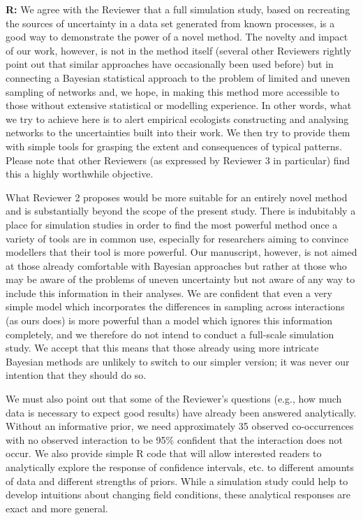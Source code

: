 \documentclass[12pt]{letter}
\begin{document}
		\textbf{R:} We agree with the Reviewer that a full simulation study, based on recreating the sources of uncertainty in a data set generated from known processes, is a good way to demonstrate the power of a novel method. The novelty and impact of our work, however, is not in the method itself (several other Reviewers rightly point out that similar approaches have occasionally been used before) but in connecting a Bayesian statistical approach to the problem of limited and uneven sampling of networks and, we hope, in making this method more accessible to those without extensive statistical or modelling experience. In other words, what we try to achieve here is to alert empirical ecologists constructing and analysing networks to the uncertainties built into their work. We then try to provide them with simple tools for grasping the extent and consequences of typical patterns. Please note that other Reviewers (as expressed by Reviewer 3 in particular) find this a highly worthwhile objective. 


		What Reviewer 2 proposes would be more suitable for an entirely novel method and is substantially beyond the scope of the present study. There is indubitably a place for simulation studies in order to find the most powerful method once a variety of tools are in common use, especially for researchers aiming to convince modellers that their tool is more powerful. Our manuscript, however, is not aimed at those already comfortable with Bayesian approaches but rather at those who may be aware of the problems of uneven uncertainty but not aware of any way to include this information in their analyses. We are confident that even a very simple model which incorporates the differences in sampling across interactions (as ours does) is more powerful than a model which ignores this information completely, and we therefore do not intend to conduct a full-scale simulation study. We accept that this means that those already using more intricate Bayesian methods are unlikely to switch to our simpler version; it was never our intention that they should do so.


		We must also point out that some of the Reviewer's questions (e.g., how much data is necessary to expect good results) have already been answered analytically. Without an informative prior, we need approximately 35 observed co-occurrences with no observed interaction to be 95\% confident that the interaction does not occur. We also provide simple R code that will allow interested readers to analytically explore the response of confidence intervals, etc. to different amounts of data and different strengths of priors. While a simulation study could help to develop intuitions about changing field conditions, these analytical responses are exact and more general.
\end{document}
